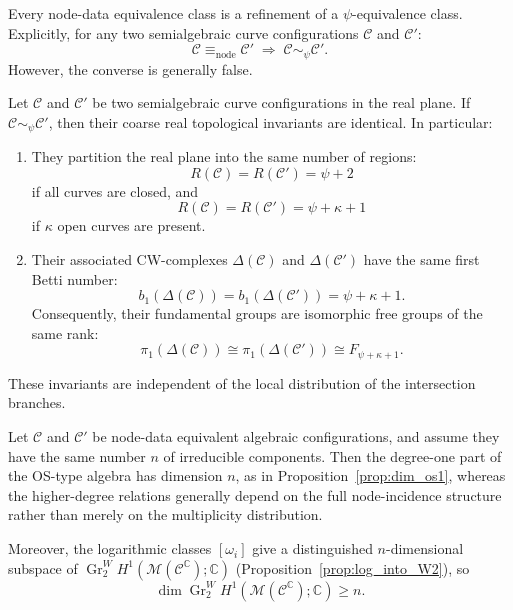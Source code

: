 \documentclass[article,11pt]{amsart} \numberwithin{equation}{section}
\numberwithin{equation}{section}
\begin{document}
{	\begin{inp}
		\label{prop:hierarchy_equiv}
		Every node-data equivalence class is a refinement of a
		$\psi$-equivalence class. Explicitly, for any two semialgebraic
		curve configurations $\mathcal C$ and $\mathcal C'$:
		\[
		\mathcal C \equiv_{\mathrm{node}} \mathcal C'
		\;\Longrightarrow\;
		\mathcal C \sim_{\psi} \mathcal C'.
		\]
		However, the converse is generally false.
	\end{inp}
	
	\begin{inp}
		\label{prop:real_rigidity}
		Let $\mathcal C$ and $\mathcal C'$ be two semialgebraic curve
		configurations in the real plane. If $\mathcal C \sim_{\psi} \mathcal C'$,
		then their coarse real topological invariants are identical.
		In particular:
		\begin{enumerate}
			\item They partition the real plane into the same number of regions:
			\[
			R(\mathcal C) = R(\mathcal C') = \psi + 2
			\]
			if all curves are closed, and
			\[
			R(\mathcal C) = R(\mathcal C') = \psi + \kappa + 1
			\]
			if $\kappa$ open curves are present.
			\item Their associated CW-complexes $\Delta(\mathcal C)$ and
			$\Delta(\mathcal C')$ have the same first Betti number:
			\[
			b_1(\Delta(\mathcal C)) = b_1(\Delta(\mathcal C')) = \psi + \kappa + 1.
			\]
			Consequently, their fundamental groups are isomorphic free groups
			of the same rank:
			\[
			\pi_1(\Delta(\mathcal C)) \cong \pi_1(\Delta(\mathcal C'))
			\cong F_{\psi+\kappa+1}.
			\]
		\end{enumerate}
		These invariants are independent of the local distribution of the
		intersection branches.
	\end{inp}
	
	\begin{rk}
		\label{rk:hodge_consequences}
		Let $\mathcal C$ and $\mathcal C'$ be node-data equivalent algebraic
		configurations, and assume they have the same number $n$ of irreducible
		components. Then the degree-one part of the OS-type algebra has
		dimension $n$, as in Proposition~\ref{prop:dim_os1}, whereas the higher-degree
		relations generally depend on the full node-incidence structure
		rather than merely on the multiplicity distribution.
		
		Moreover, the logarithmic classes $[\omega_i]$ give a distinguished
		$n$-dimensional subspace of
		$\operatorname{Gr}_2^W H^1(\mathcal M(\mathcal C^\mathbb C);\mathbb C)$
		(Proposition~\ref{prop:log_into_W2}), so
		\[
		\dim \operatorname{Gr}_2^W H^1(\mathcal M(\mathcal C^\mathbb C);\mathbb C)\ge n.
		\]
		

\end{rk}}
\end{document}
